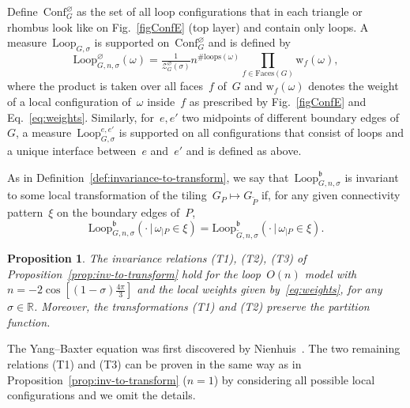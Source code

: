 \documentclass[reqno,11pt,a4paper]{amsart}
\newtheorem{proposition}{Proposition}[section]
\theoremstyle{remark}
\newcommand{\bbR}{\mathbb{R}}
\renewcommand{\b}{\mathfrak{b}}
\newcommand{\conf}{\mathrm{Conf}}
\def\cZ{\mathcal Z}
\begin{document}
Define~$\conf_G^\varnothing$ as the set of all loop configurations that in each triangle or rhombus look like on Fig.~\ref{figConfE} (top layer) and contain only loops.
A measure~$\mathrm{Loop}_{G,\sigma}$ is supported on~$\conf_G^\varnothing$ and is defined by
\[
	\mathrm{Loop}_{G,n,\sigma}^\varnothing(\omega) = \tfrac{1}{\cZ_G^\varnothing(\sigma)}n^{\#\mathrm{loops}(\omega)}\prod_{f\in \mathrm{Faces}(G)} \mathrm{w}_f(\omega),
\]
where the product is taken over all faces~$f$ of~$G$ and $\mathrm{w}_f(\omega)$ denotes the weight of a local configuration of~$\omega$ inside~$f$ as prescribed by Fig.~\ref{figConfE} and Eq.~\eqref{eq:weights}. Similarly, for~$e,e'$ two midpoints of different boundary edges of~$G$, a measure~$\mathrm{Loop}_{G,\sigma}^{e,e'}$ is supported on all configurations that consist of loops and a unique interface between~$e$ and~$e'$ and is defined as above.

As in Definition~\ref{def:invariance-to-transform}, we say that~$\mathrm{Loop}_{G,n,\sigma}^\b$ is invariant to some local transformation of the tiling~$G_P\mapsto G_{\tilde{P}}$ if, for any given connectivity pattern~$\xi$ on the boundary edges of~$P$,
\[
	\mathrm{Loop}_{G,n,\sigma}^\b(\cdot \, \vert \, \omega_{|P}\in\xi) =
	\mathrm{Loop}_{\tilde{G},n,\sigma}^\b(\cdot \, \vert \, \omega_{|P}\in\xi).
\]

\begin{proposition}\label{prop:inv-to-transform-o-n}
	The invariance relations (T1), (T2), (T3) of Proposition~\ref{prop:inv-to-transform} hold for the loop~$O(n)$ model with~$n=-2\cos [(1-\sigma)\frac{4\pi}{3}]$ and the local weights given by~\eqref{eq:weights}, for any~$\sigma\in \bbR$.
	Moreover, the transformations (T1) and (T2) preserve the partition function.
\end{proposition}

The Yang--Baxter equation was first discovered by Nienhuis~\cite{Nie90}.
The two remaining relations (T1) and (T3) can be proven in the same way as in Proposition~\ref{prop:inv-to-transform} ($n=1$) by considering all possible local configurations and we omit the details.
\end{document}
